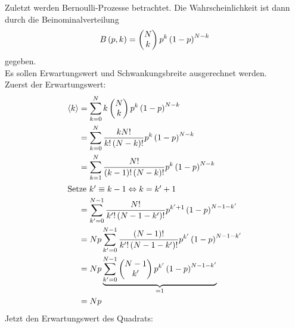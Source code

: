 \documentclass[11pt, ngerman, fleqn, DIV=15, headinclude]{scrartcl}
\begin{document}
\subsubsection{}
Zuletzt werden Bernoulli-Prozesse betrachtet. Die Wahrscheinlichkeit ist dann durch die Beinominalverteilung
\begin{align*}
	B\left( p,k \right) = 
	\begin{pmatrix}
		N\\
		k			
	\end{pmatrix}
	p^k\left( 1-p \right)^{N-k}
\end{align*}
gegeben.\\
Es sollen Erwartungswert und Schwankungsbreite ausgerechnet werden.\\
Zuerst der Erwartungswert:
\begin{align*}
	\braket{k}	&= \sum_{k=0}^N k
				\begin{pmatrix}
					N\\
					k			
				\end{pmatrix}
				p^k\del{1-p}^{N-k}\\
				&= \sum_{k=0}^N \frac{kN!}{k!\del{N-k}!}p^k\del{1-p}^{N-k}\\
				&= \sum_{k=1}^N \frac{N!}{\del{k-1}!\del{N-k}!}p^{k}\del{1-p}^{N-k}\\
	\intertext{%
		Setze $k' \equiv k - 1 \Leftrightarrow k = k' + 1$
	}
				&= \sum_{k'=0}^{N-1} \frac{N!}{k'!\del{N-1-k'}!}p^{k'+1}\del{1-p}^{N-1-k'}\\
				&= Np\sum_{k'=0}^{N-1} \frac{\del{N-1}!}{k'!\del{N-1-k'}!}p^{k'}\del{1-p}^{N-1-k'}\\
				&= Np\underbrace{\sum_{k'=0}^{N-1}
				\begin{pmatrix}
					N-1\\
					k'			
				\end{pmatrix}
				p^{k'}\del{1-p}^{N-1-k'}}_{=1}\\
				&= Np
\end{align*}
Jetzt den Erwartungswert des Quadrats:
\end{document}
